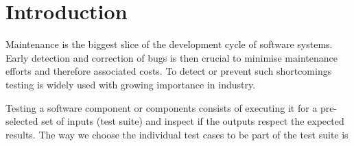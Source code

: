 
\section{Introduction}
\label{sec:intro}


Maintenance is the biggest slice of the development cycle of software
systems.
%
Early detection and correction of bugs is then crucial to minimise
maintenance efforts and therefore associated costs.
%
To detect or prevent such shortcomings testing is widely used with
growing importance in industry.

Testing a software component or components consists of executing it for
a pre-selected set of inputs (test suite) and inspect if the outputs
respect the expected results.
%
The way we choose the individual test cases to be part of the test suite
is 








%


